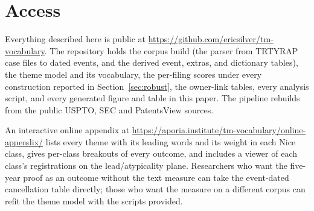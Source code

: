 \section{Access}\label{sec:access}

Everything described here is public at
\url{https://github.com/ericsilver/tm-vocabulary}. The repository holds
the corpus build (the parser from TRTYRAP case files to dated events, and
the derived event, extras, and dictionary tables), the theme model and
its vocabulary, the per-filing scores under every construction reported
in Section~\ref{sec:robust}, the owner-link tables, every analysis script,
and every generated figure and table in this paper. The pipeline rebuilds
from the public USPTO, SEC and PatentsView sources.

An interactive online appendix at
\url{https://aporia.institute/tm-vocabulary/online-appendix/} lists every
theme with its leading words and its weight in each Nice class, gives
per-class breakouts of every outcome, and includes a viewer of each
class's registrations on the lead/atypicality plane. Researchers who want
the five-year proof as an outcome without the text measure can take the
event-dated cancellation table directly; those who want the measure on a
different corpus can refit the theme model with the scripts provided.
